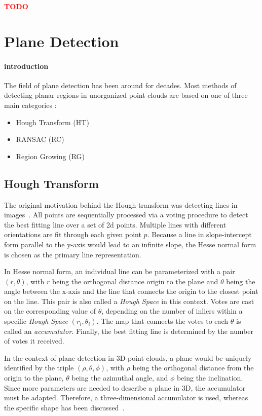 \documentclass[main.tex]{subfiles}
\begin{document}
\textbf{\textcolor{red}{TODO}}

\section{Plane Detection}
\paragraph*{introduction}
The field of plane detection has been around for decades.
Most methods of detecting planar regions in unorganized point clouds are based on one of three main categories \cite*{Limberger_Oliveira_2015,Araújo_Oliveira_2020}:
\begin{itemize}
    \item Hough Transform (HT)
    \item RANSAC (RC)
    \item Region Growing (RG)
\end{itemize}

\subsection*{Hough Transform}
The original motivation behind the Hough transform was detecting lines in images~\cite{5230799}. All points are sequentially processed via a voting procedure to detect the best fitting line over a set of 2d points.
Multiple lines with different orientations are fit through each given point $p$.
Because a line in slope-intercept form parallel to the y-axis would lead to an infinite slope, the Hesse normal form is chosen as the primary line representation\cite{10.1145/361237.361242}.

In Hesse normal form, an individual line can be parameterized with a pair $(r, \theta)$, with $r$  being the orthogonal distance origin to the plane and $\theta$ being the angle between the x-axis and the line that connects the origin to the closest point on the line.
This pair is also called a \textit{Hough Space} in this context. Votes are cast on the corresponding value of $\theta$, depending on the number of inliers within a specific \textit{Hough Space} $(r_i,\theta_i)$. The map that connects the
votes to each $\theta$ is called an \textit{accumulator}.
Finally, the best fitting line is determined by the number of votes it received.

In the context of plane detection in 3D point clouds, a plane would be uniquely identified by the triple $(\rho, \theta, \phi)$, with $\rho$ being the orthogonal distance from the origin to the plane, $\theta$ being the azimuthal angle, and $\phi$ being the inclination.
Since more parameters are needed to describe a plane in 3D, the accumulator must be adapted.
Therefore, a three-dimensional accumulator is used, whereas the specific shape has been discussed~\cite*{Borrmann_Elseberg_Lingemann_Nüchter_2011}.
\end{document}
